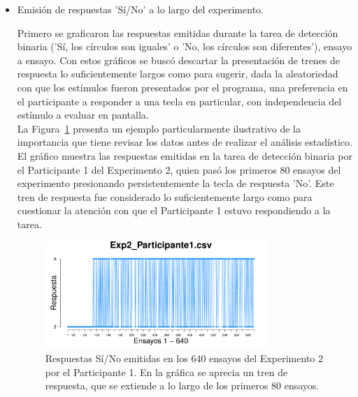 \begin{itemize}
	\item Emisión de respuestas 'Sí/No' a lo largo del experimento.

Primero se graficaron las respuestas emitidas durante la tarea de detección binaria ('Sí, los círculos son iguales' o 'No, los círculos son diferentes'), ensayo a ensayo. Con estos gráficos se buscó descartar la presentación de trenes de respuesta lo suficientemente largos como para sugerir, dada la aleatoriedad con que los estímulos fueron presentados por el programa, una preferencia en el participante a responder a una tecla en particular, con independencia del estímulo a evaluar en pantalla.\\

La Figura~\ref{fig:Resp_E2_P1} presenta un ejemplo particularmente ilustrativo de la importancia que tiene revisar los datos antes de realizar el análisis estadístico. El gráfico muestra las respuestas emitidas en la tarea de detección binaria por el Participante 1 del Experimento 2, quien pasó los primeros 80 ensayos del experimento presionando persistentemente la tecla de respuesta 'No'. Este tren de respuesta fue considerado lo suficientemente largo como para cuestionar la atención con que el Participante 1 estuvo respondiendo a la tarea.\\ 

\begin{figure}[th]
\centering
\includegraphics[width=0.80\textwidth]{Figures/Response_Exp2_P1} 
\caption[Explorando datos individuales (ejemplo): Respuesta emitida por cada ensayo a la tarea binaria]{Respuestas Sí/No emitidas en los 640 ensayos del Experimento 2 por el Participante 1. En la gráfica se aprecia un tren de respuesta, que se extiende a lo largo de los primeros 80 ensayos.}
\label{fig:Resp_E2_P1}
\end{figure}



\end{itemize}
